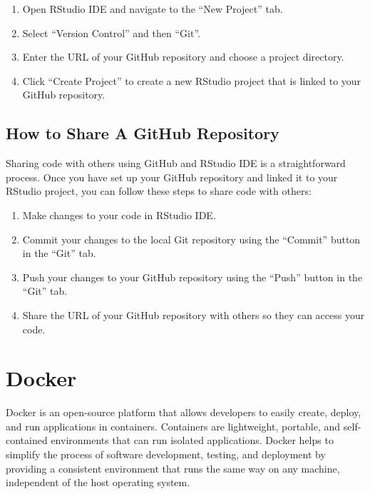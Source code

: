 \documentclass[
]{book}
\providecommand{\tightlist}{%
  \setlength{\itemsep}{0pt}\setlength{\parskip}{0pt}}
\begin{document}
\begin{enumerate}
\def\labelenumi{\arabic{enumi}.}
\tightlist
\item
  Open RStudio IDE and navigate to the ``New Project'' tab.
\item
  Select ``Version Control'' and then ``Git''.
\item
  Enter the URL of your GitHub repository and choose a project directory.
\item
  Click ``Create Project'' to create a new RStudio project that is linked to your GitHub repository.
\end{enumerate}

\hypertarget{how-to-share-a-github-repository}{%
\subsection*{How to Share A GitHub Repository}\label{how-to-share-a-github-repository}}

Sharing code with others using GitHub and RStudio IDE is a straightforward process. Once you have set up your GitHub repository and linked it to your RStudio project, you can follow these steps to share code with others:

\begin{enumerate}
\def\labelenumi{\arabic{enumi}.}
\tightlist
\item
  Make changes to your code in RStudio IDE.
\item
  Commit your changes to the local Git repository using the ``Commit'' button in the ``Git'' tab.
\item
  Push your changes to your GitHub repository using the ``Push'' button in the ``Git'' tab.
\item
  Share the URL of your GitHub repository with others so they can access your code.
\end{enumerate}

\hypertarget{docker}{%
\section{Docker}\label{docker}}

Docker is an open-source platform that allows developers to easily create, deploy, and run applications in containers. Containers are lightweight, portable, and self-contained environments that can run isolated applications. Docker helps to simplify the process of software development, testing, and deployment by providing a consistent environment that runs the same way on any machine, independent of the host operating system.
\end{document}
